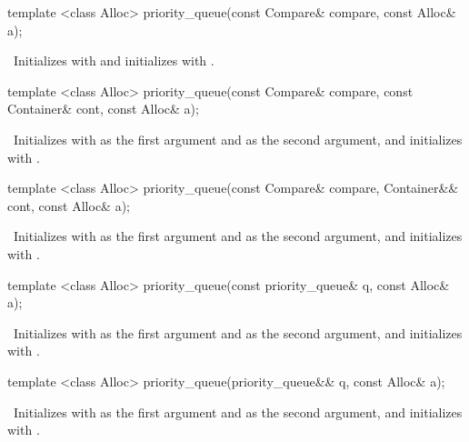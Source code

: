 \begin{itemdecl}
template <class Alloc>
  priority_queue(const Compare& compare, const Alloc& a);
\end{itemdecl}

\begin{itemdescr}
\pnum
\effects\ Initializes  with  and initializes  with .
\end{itemdescr}

\begin{itemdecl}
template <class Alloc>
  priority_queue(const Compare& compare, const Container& cont, const Alloc& a);
\end{itemdecl}

\begin{itemdescr}
\pnum
\effects\ Initializes  with  as the first argument and  as the second
argument, and initializes  with .
\end{itemdescr}

\begin{itemdecl}
template <class Alloc>
  priority_queue(const Compare& compare, Container&& cont, const Alloc& a);
\end{itemdecl}

\begin{itemdescr}
\pnum
\effects\ Initializes  with  as the first argument and 
as the second argument, and initializes  with .
\end{itemdescr}

\begin{itemdecl}
template <class Alloc>
  priority_queue(const priority_queue& q, const Alloc& a);
\end{itemdecl}

\begin{itemdescr}
\pnum
\effects\ Initializes  with  as the first argument and  as
the second argument, and initializes  with .
\end{itemdescr}

\begin{itemdecl}
template <class Alloc>
  priority_queue(priority_queue&& q, const Alloc& a);
\end{itemdecl}

\begin{itemdescr}
\pnum
\effects\ Initializes  with  as the first argument and 
as the second argument, and initializes  with .
\end{itemdescr}

